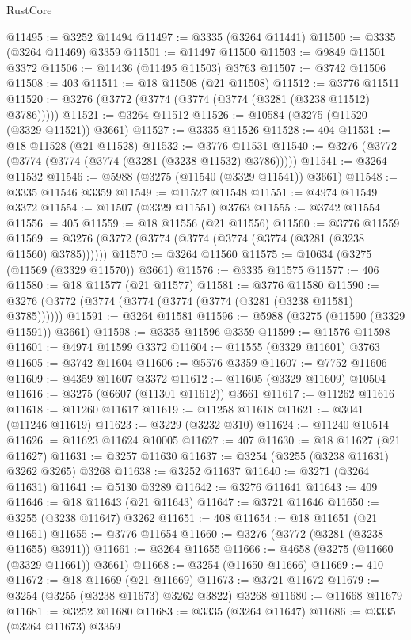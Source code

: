 \begin{lexlean}{RustCore}
\begin{coremodule}
@11495 := @3252 @11494
@11497 := @3335 (@3264 @11441)
@11500 := @3335 (@3264 @11469) @3359
@11501 := @11497 @11500
@11503 := @9849 @11501 @3372
@11506 := @11436 (@11495 @11503) @3763
@11507 := @3742 @11506
@11508 := 403
@11511 := @18 @11508 (@21 @11508)
@11512 := @3776 @11511
@11520 := @3276 (@3772 (@3774 (@3774 (@3774 (@3281 (@3238 @11512) @3786)))))
@11521 := @3264 @11512
@11526 := @10584 (@3275 (@11520 (@3329 @11521)) @3661)
@11527 := @3335 @11526
@11528 := 404
@11531 := @18 @11528 (@21 @11528)
@11532 := @3776 @11531
@11540 := @3276 (@3772 (@3774 (@3774 (@3774 (@3281 (@3238 @11532) @3786)))))
@11541 := @3264 @11532
@11546 := @5988 (@3275 (@11540 (@3329 @11541)) @3661)
@11548 := @3335 @11546 @3359
@11549 := @11527 @11548
@11551 := @4974 @11549 @3372
@11554 := @11507 (@3329 @11551) @3763
@11555 := @3742 @11554
@11556 := 405
@11559 := @18 @11556 (@21 @11556)
@11560 := @3776 @11559
@11569 := @3276 (@3772 (@3774 (@3774 (@3774 (@3774 (@3281 (@3238 @11560) @3785))))))
@11570 := @3264 @11560
@11575 := @10634 (@3275 (@11569 (@3329 @11570)) @3661)
@11576 := @3335 @11575
@11577 := 406
@11580 := @18 @11577 (@21 @11577)
@11581 := @3776 @11580
@11590 := @3276 (@3772 (@3774 (@3774 (@3774 (@3774 (@3281 (@3238 @11581) @3785))))))
@11591 := @3264 @11581
@11596 := @5988 (@3275 (@11590 (@3329 @11591)) @3661)
@11598 := @3335 @11596 @3359
@11599 := @11576 @11598
@11601 := @4974 @11599 @3372
@11604 := @11555 (@3329 @11601) @3763
@11605 := @3742 @11604
@11606 := @5576 @3359
@11607 := @7752 @11606
@11609 := @4359 @11607 @3372
@11612 := @11605 (@3329 @11609) @10504
@11616 := @3275 (@6607 (@11301 @11612)) @3661
@11617 := @11262 @11616
@11618 := @11260 @11617
@11619 := @11258 @11618
@11621 := @3041 (@11246 @11619)
@11623 := @3229 (@3232 @310)
@11624 := @11240 @10514
@11626 := @11623 @11624 @10005
@11627 := 407
@11630 := @18 @11627 (@21 @11627)
@11631 := @3257 @11630
@11637 := @3254 (@3255 (@3238 @11631) @3262 @3265) @3268
@11638 := @3252 @11637
@11640 := @3271 (@3264 @11631)
@11641 := @5130 @3289
@11642 := @3276 @11641
@11643 := 409
@11646 := @18 @11643 (@21 @11643)
@11647 := @3721 @11646
@11650 := @3255 (@3238 @11647) @3262
@11651 := 408
@11654 := @18 @11651 (@21 @11651)
@11655 := @3776 @11654
@11660 := @3276 (@3772 (@3281 (@3238 @11655) @3911))
@11661 := @3264 @11655
@11666 := @4658 (@3275 (@11660 (@3329 @11661)) @3661)
@11668 := @3254 (@11650 @11666)
@11669 := 410
@11672 := @18 @11669 (@21 @11669)
@11673 := @3721 @11672
@11679 := @3254 (@3255 (@3238 @11673) @3262 @3822) @3268
@11680 := @11668 @11679
@11681 := @3252 @11680
@11683 := @3335 (@3264 @11647)
@11686 := @3335 (@3264 @11673) @3359

\end{coremodule}
\end{lexlean}
